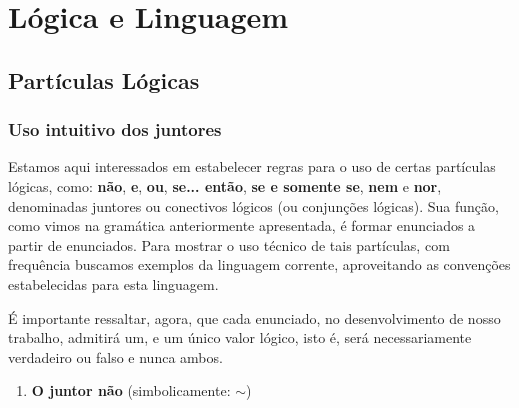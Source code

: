 \chapter{Lógica e Linguagem}

\section{Partículas Lógicas}

\subsection{Uso intuitivo dos juntores}

Estamos aqui interessados em estabelecer regras para o uso de certas partículas lógicas, como: \textbf{não}, \textbf{e},  \textbf{ou}, \textbf{se... então}, \textbf{se e somente se}, \textbf{nem} e \textbf{nor}, denominadas juntores ou conectivos lógicos (ou conjunções lógicas).
Sua função, como vimos na gramática anteriormente apresentada, é formar enunciados a partir de enunciados.
Para mostrar o uso técnico de tais partículas, com frequência buscamos exemplos da  linguagem corrente, aproveitando as convenções estabelecidas para esta linguagem.

É importante ressaltar, agora, que cada enunciado, no desenvolvimento de nosso trabalho, admitirá um, e um único valor lógico, isto é, será necessariamente verdadeiro ou  falso e nunca ambos.

\begin{enumerate}[label=(\arabic*)]
    \item \textbf{O juntor não} (simbolicamente: $\sim$)
\end{enumerate}
